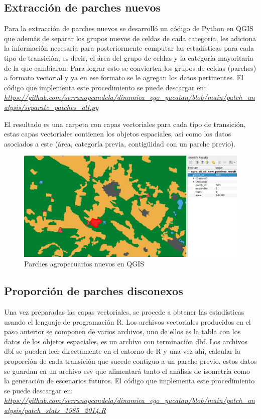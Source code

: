 \documentclass[12pt,a4paper,oldfontcommands]{article}
\begin{document}
\subsection{Extracción de parches nuevos}
Para la extracción de parches nuevos se desarrolló un código de Python en QGIS que además de separar los grupos nuevos de celdas de cada categoría, les adiciona la información necesaria para posteriormente computar las estadísticas para cada tipo de transición, es decir, el área del grupo de celdas y la categoría mayoritaria de la que cambiaron. Para lograr esto se convierten los grupos de celdas (parches) a formato vectorial y ya en ese formato se le agregan los datos pertinentes. El código que implementa este procedimiento se puede descargar en: \textit{\url{https://github.com/serranoycandela/dinamica_ego_yucatan/blob/main/patch_analysis/separate_patches_all.py}}

El resultado es una carpeta con capas vectoriales para cada tipo de transición, estas capas vectoriales contienen los objetos espaciales, así como los datos asociados a este (área, categoría previa, contigüidad con un parche previo). 

\begin{figure}[h]
	\centering
	\includegraphics[width=1\textwidth]{./figuras/parches.png}
	\caption{Parches agropecuarios nuevos en QGIS}
	\label{fig:parches}
\end{figure}


\subsection{Proporción de parches disconexos}
Una vez preparadas las capas vectoriales, se procede a obtener las estadísticas usando el lenguaje de programación R. Los archivos vectoriales producidos en el paso anterior se componen de varios archivos, uno de ellos es la tabla con los datos de los objetos espaciales, es un archivo con terminación dbf. Los archivos dbf se pueden leer directamente en el entorno de R y una vez ahí, calcular la proporción de cada transición que sucede contiguo a un parche previo, estos datos se guardan en un archivo csv que alimentará tanto el análisis de isometría como la generación de escenarios futuros. El código que implementa este procedimiento se puede descargar en:  \textit{\url{https://github.com/serranoycandela/dinamica_ego_yucatan/blob/main/patch_analysis/patch_stats_1985_2014.R}}
\end{document}

